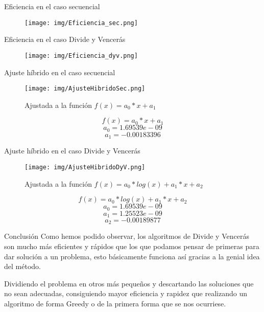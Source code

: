 \documentclass[12pt]{beamer}
\begin{document}
\begin{frame}{Eficiencia en el caso secuencial}

\begin{figure}[H] 
\centering
\texttt{[image: img/Eficiencia\_sec.png]} 
\end{figure}

\end{frame}

\begin{frame}{Eficiencia en el caso Divide y Vencerás}

\begin{figure}[H] 
\centering
\texttt{[image: img/Eficiencia\_dyv.png]} 
\end{figure}

\end{frame}

\begin{frame}{Ajuste híbrido en el caso secuencial}

\begin{figure}[H] 
\centering
\texttt{[image: img/AjusteHibridoSec.png]} 
\caption{Ajustada a la función $f(x)=a_0*x+a_1$} 
\end{figure}

\end{frame}

\begin{frame}
\[
f(x)=a_0*x+a_1 
\]
\[
a_0=1.69539e-09
\]
\[
a_1=-0.00183396
\]
\end{frame}

\begin{frame}{Ajuste híbrido en el caso Divide y Vencerás}

\begin{figure}[H] 
\centering
\texttt{[image: img/AjusteHibridoDyV.png]} 
\caption{Ajustada a la función $f(x)=a_0*log(x)+a_1*x+a_2$} 
\end{figure}

\end{frame}

\begin{frame}
\[
f(x)=a_0*log(x)+a_1*x+a_2
\]
\[
a_0=1.69539e-09
\]
\[
a_1=1.25523e-09
\]
\[
a_2=-0.00189877
\]
\end{frame}

\begin{frame}{Conclusión}
Como hemos podido observar, los algoritmos de Divide y Vencerás son mucho más eficientes y rápidos que los que podamos pensar de primeras para dar solución a un problema, esto básicamente funciona así gracias a la genial idea del método. 

\vspace{5mm} %

Dividiendo el problema en otros más pequeños y descartando las soluciones que no sean adecuadas, consiguiendo mayor eficiencia y rapidez que realizando un algoritmo de forma Greedy o de la primera forma que se nos ocurriese.
\end{frame}
\end{document}
